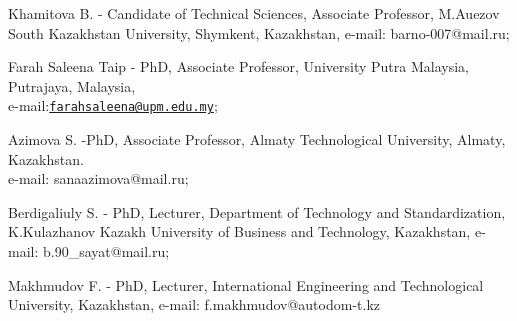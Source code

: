 \begin{authorinfo}
Khamitova B. - Candidate of Technical Sciences, Associate Professor,
M.Auezov South Kazakhstan University, Shymkent, Kazakhstan, e-mail:
barno-007@mail.ru;

Farah Saleena Taip - PhD, Associate Professor, University Putra
Malaysia, Putrajaya, Malaysia,\\
e-mail:\href{mailto:farahsaleena@upm.edu.my}{\nolinkurl{farahsaleena@upm.edu.my}};

Azimova S. -PhD, Associate Professor, Almaty Technological University,
Almaty, Kazakhstan.\\
e-mail: sanaazimova@mail.ru;

Berdigaliuly S. - PhD, Lecturer, Department of Technology and
Standardization, K.Kulazhanov Kazakh University of Business and
Technology, Kazakhstan, e-mail: b.90\_sayat@mail.ru;

Makhmudov F. - PhD, Lecturer, International Engineering and
Technological University, Kazakhstan, e-mail: f.makhmudov@autodom-t.kz\
\end{authorinfo}
